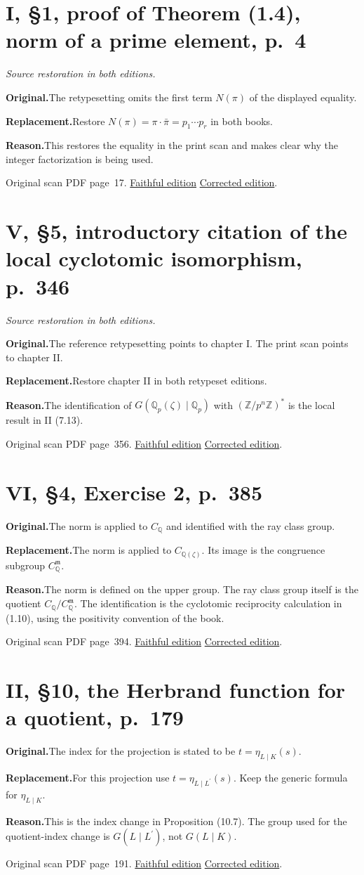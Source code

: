 \documentclass[11pt,a4paper]{article}
\newcommand{\original}{\par\smallskip\noindent\textbf{Original.}\enspace}
\newcommand{\replacement}{\par\smallskip\noindent\textbf{Replacement.}\enspace}
\newcommand{\reason}{\par\smallskip\noindent\textbf{Reason.}\enspace}
\newcommand{\editionlink}[3]{\href{#1\#errata.#2}{#3}}
\newcommand{\location}[2]{%
  \par\smallskip\noindent Original scan PDF page~#2.\enspace
  \editionlink{Neukirch_Faithful.pdf}{#1}{Faithful edition}
  \quad\editionlink{Neukirch_Corrected.pdf}{#1}{Corrected edition}.}
\begin{document}
\setcounter{section}{39}
\section{I, \S1, proof of Theorem (1.4), norm of a prime element, p.~4}\label{errata:item:40}
\noindent\emph{Source restoration in both editions.}\par
\original The retypesetting omits the first term $N(\pi)$ of the displayed equality.
\replacement Restore $N(\pi)=\pi\cdot\bar\pi=p_1\cdots p_r$ in both books.
\reason This restores the equality in the print scan and makes clear why the integer factorization is being used.
\location{40}{17}

\setcounter{section}{40}
\section{V, \S5, introductory citation of the local cyclotomic isomorphism, p.~346}\label{errata:item:41}
\noindent\emph{Source restoration in both editions.}\par
\original The reference retypesetting points to chapter I. The print scan points to chapter II.
\replacement Restore chapter II in both retypeset editions.
\reason The identification of $G(\mathbb Q_p(\zeta)\mid\mathbb Q_p)$ with $(\mathbb Z/p^n\mathbb Z)^*$ is the local result in II (7.13).
\location{41}{356}

\setcounter{section}{41}
\section{VI, \S4, Exercise 2, p.~385}\label{errata:item:42}
\original The norm is applied to $C_{\mathbb Q}$ and identified with the ray class group.
\replacement The norm is applied to $C_{\mathbb Q(\zeta)}$. Its image is the congruence subgroup $C_{\mathbb Q}^{\mathfrak m}$.
\reason The norm is defined on the upper group. The ray class group itself is the quotient $C_{\mathbb Q}/C_{\mathbb Q}^{\mathfrak m}$. The identification is the cyclotomic reciprocity calculation in (1.10), using the positivity convention of the book.
\location{42}{394}

\setcounter{section}{42}
\section{II, \S10, the Herbrand function for a quotient, p.~179}\label{errata:item:43}
\original The index for the projection is stated to be $t=\eta_{L\mid K}(s)$.
\replacement For this projection use $t=\eta_{L\mid L^{\prime}}(s)$. Keep the generic formula for $\eta_{L\mid K}$.
\reason This is the index change in Proposition (10.7). The group used for the quotient-index change is $G(L\mid L^{\prime})$, not $G(L\mid K)$.
\location{43}{191}
\end{document}
